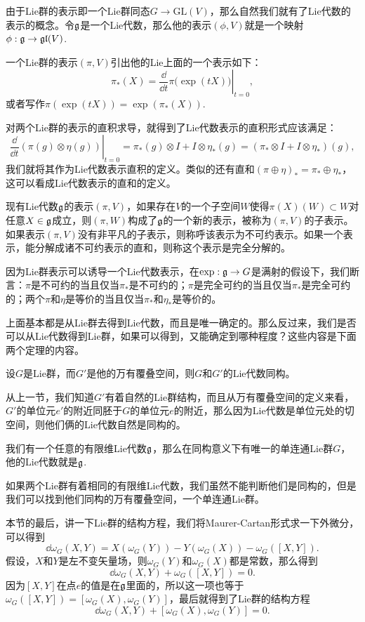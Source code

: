 \para 由于Lie群的表示即一个Lie群同态$G\to \mathrm{GL}(V)$，那么自然我们就有了Lie代数的表示的概念。令${\mathfrak{g}}$是一个Lie代数，那么他的表示$(\phi,V)$就是一个映射$\phi:{\mathfrak{g}}\to\mathfrak{gl}(V)$.

一个Lie群的表示$(\pi,V)$引出他的Lie上面的一个表示如下：
\[
	\pi_*(X)=\left.\frac{\dd}{\dd t}\pi\bigl(\exp(tX)\bigr)\right|_{t=0},
\]
或者写作$\pi(\exp(tX))=\exp(\pi_*(X))$.

对两个Lie群的表示的直积求导，就得到了Lie代数表示的直积形式应该满足：
\[
	\left.\frac{\dd}{\dd t}(\pi(g)\otimes \eta(g))\right|_{t=0}=\pi_*(g)\otimes I+I\otimes \eta_*(g)=(\pi_*\otimes I+I\otimes \eta_*)(g),
\]
我们就将其作为Lie代数表示直积的定义。类似的还有直和$(\pi\oplus \eta)_*=\pi_*\oplus \eta_*$，这可以看成Lie代数表示的直和的定义。

\para 现有Lie代数${\mathfrak{g}}$的表示$(\pi,V)$，如果存在$V$的一个子空间$W$使得$\pi(X)(W)\subset W$对任意$X\in {\mathfrak{g}}$成立，则$(\pi,W)$构成了${\mathfrak{g}}$的一个新的表示，被称为$(\pi,V)$的子表示。如果表示$(\pi,V)$没有非平凡的子表示，则称呼该表示为不可约表示。如果一个表示，能分解成诸不可约表示的直和，则称这个表示是完全分解的。

\pro 因为Lie群表示可以诱导一个Lie代数表示，在$\exp:{\mathfrak{g}}\to G$是满射的假设下，我们断言：$\pi$是不可约的当且仅当$\pi_*$是不可约的；$\pi$是完全可约的当且仅当$\pi_*$是完全可约的；两个$\pi$和$\eta$是等价的当且仅当$\pi_*$和$\eta_*$是等价的。

上面基本都是从Lie群去得到Lie代数，而且是唯一确定的。那么反过来，我们是否可以从Lie代数得到Lie群，如果可以得到，又能确定到哪种程度？这些内容是下面两个定理的内容。

\para 设$G$是Lie群，而$G'$是他的万有覆叠空间，则$G$和$G'$的Lie代数同构。

从上一节，我们知道$G'$有着自然的Lie群结构，而且从万有覆叠空间的定义来看，$G'$的单位元$e'$的附近同胚于$G$的单位元$e$的附近，那么因为Lie代数是单位元处的切空间，则他们俩的Lie代数自然是同构的。

\pro 我们有一个任意的有限维Lie代数${\mathfrak{g}}$，那么在同构意义下有唯一的单连通Lie群$G$，他的Lie代数就是${\mathfrak{g}}$.

如果两个Lie群有着相同的有限维Lie代数，我们虽然不能判断他们是同构的，但是我们可以找到他们同构的万有覆叠空间，一个单连通Lie群。

\para 本节的最后，讲一下Lie群的结构方程，我们将Maurer-Cartan形式求一下外微分，可以得到
\[
\dd \omega_G(X,Y)=X(\omega_G(Y))-Y(\omega_G(X))-\omega_G([X,Y]).
\]
假设，$X$和$Y$是左不变矢量场，则$\omega_G(Y)$和$\omega_G(X)$都是常数，那么得到
\[
\dd \omega_G(X,Y)+\omega_G([X,Y])=0.
\]
因为$[X,Y]$在点$e$的值是在${\mathfrak{g}}$里面的，所以这一项也等于$\omega_G([X,Y])=[\omega_G(X),\omega_G(Y)]$，最后就得到了Lie群的结构方程
\[
\dd \omega_G(X,Y)+[\omega_G(X),\omega_G(Y)]=0.
\]

